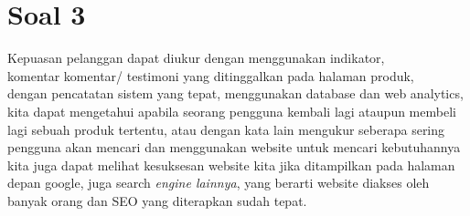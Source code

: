 \documentclass{article}
\begin{document}
\section*{Soal 3}
\noindent Kepuasan pelanggan dapat diukur dengan menggunakan indikator, \\
komentar komentar/ testimoni yang ditinggalkan pada halaman produk,\\
dengan pencatatan sistem yang tepat, menggunakan database dan web analytics, kita dapat mengetahui apabila seorang pengguna kembali lagi ataupun membeli lagi sebuah produk tertentu, atau dengan kata lain mengukur seberapa sering pengguna akan mencari dan menggunakan website untuk mencari kebutuhannya\\ 
kita juga dapat melihat kesuksesan website kita jika ditampilkan pada halaman depan google, juga search \emph{engine lainnya}, yang berarti website diakses oleh banyak orang dan SEO yang diterapkan sudah tepat.
\end{document}
